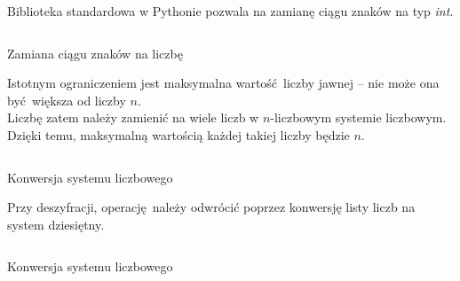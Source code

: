 \documentclass[12pt]{article}
\begin{document}
Biblioteka standardowa w Pythonie 
pozwala na zamianę ciągu znaków na typ \textit{int}.

\begin{listing}[H]
	\inputminted[]{python}{3-bytes-example.py}
	\caption{Zamiana ciągu znaków na liczbę}
\end{listing}

Istotnym ograniczeniem jest maksymalna wartość liczby jawnej -- nie może
ona być większa od liczby $n$.
\\

Liczbę zatem należy zamienić
na wiele liczb w $n$-liczbowym systemie liczbowym.
Dzięki temu, maksymalną wartością każdej takiej liczby będzie $n$.

\begin{listing}[H]
	\inputminted[firstline=7,lastline=17]{python}{../rsa.py}
	\caption{Konwersja systemu liczbowego}
\end{listing}

Przy deszyfracji, operację należy odwrócić poprzez konwersję listy
liczb na system dziesiętny.

\begin{listing}[H]
	\inputminted[firstline=19,lastline=26]{python}{../rsa.py}
	\caption{Konwersja systemu liczbowego}
\end{listing}
\end{document}
